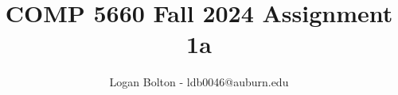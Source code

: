 


\title{COMP 5660 Fall 2024 Assignment 1a}
\author{Logan Bolton - ldb0046@auburn.edu}
\date{}

\maketitle


